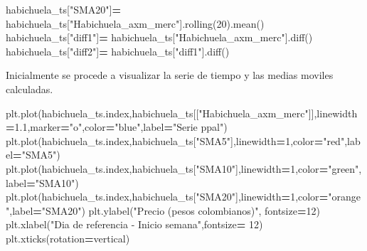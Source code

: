 \documentclass[
]{book}
\newenvironment{Shaded}{\begin{snugshade}}{\end{snugshade}}
\newcommand{\DecValTok}[1]{\textcolor[rgb]{0.00,0.00,0.81}{#1}}
\newcommand{\FloatTok}[1]{\textcolor[rgb]{0.00,0.00,0.81}{#1}}
\newcommand{\NormalTok}[1]{#1}
\newcommand{\OperatorTok}[1]{\textcolor[rgb]{0.81,0.36,0.00}{\textbf{#1}}}
\newcommand{\StringTok}[1]{\textcolor[rgb]{0.31,0.60,0.02}{#1}}
\begin{document}
\begin{Shaded}
\begin{Highlighting}[]
\NormalTok{habichuela\_ts[}\StringTok{"SMA20"}\NormalTok{]}\OperatorTok{=}\NormalTok{ habichuela\_ts[}\StringTok{"Habichuela\_axm\_merc"}\NormalTok{].rolling(}\DecValTok{20}\NormalTok{).mean()}
\NormalTok{habichuela\_ts[}\StringTok{"diff1"}\NormalTok{]}\OperatorTok{=}\NormalTok{ habichuela\_ts[}\StringTok{"Habichuela\_axm\_merc"}\NormalTok{].diff()}
\NormalTok{habichuela\_ts[}\StringTok{"diff2"}\NormalTok{]}\OperatorTok{=}\NormalTok{ habichuela\_ts[}\StringTok{"diff1"}\NormalTok{].diff()}
\end{Highlighting}
\end{Shaded}

Inicialmente se procede a visualizar la serie de tiempo y las medias moviles calculadas.

\begin{Shaded}
\begin{Highlighting}[]

\NormalTok{plt.plot(habichuela\_ts.index,habichuela\_ts[[}\StringTok{"Habichuela\_axm\_merc"}\NormalTok{]],linewidth}\OperatorTok{=}\FloatTok{1.1}\NormalTok{,marker}\OperatorTok{=}\StringTok{"o"}\NormalTok{,color}\OperatorTok{=}\StringTok{"blue"}\NormalTok{,label}\OperatorTok{=}\StringTok{"Serie ppal"}\NormalTok{)}
\NormalTok{plt.plot(habichuela\_ts.index,habichuela\_ts[}\StringTok{"SMA5"}\NormalTok{],linewidth}\OperatorTok{=}\DecValTok{1}\NormalTok{,color}\OperatorTok{=}\StringTok{"red"}\NormalTok{,label}\OperatorTok{=}\StringTok{"SMA5"}\NormalTok{)}
\NormalTok{plt.plot(habichuela\_ts.index,habichuela\_ts[}\StringTok{"SMA10"}\NormalTok{],linewidth}\OperatorTok{=}\DecValTok{1}\NormalTok{,color}\OperatorTok{=}\StringTok{"green"}\NormalTok{,label}\OperatorTok{=}\StringTok{"SMA10"}\NormalTok{)}
\NormalTok{plt.plot(habichuela\_ts.index,habichuela\_ts[}\StringTok{"SMA20"}\NormalTok{],linewidth}\OperatorTok{=}\DecValTok{1}\NormalTok{,color}\OperatorTok{=}\StringTok{"orange"}\NormalTok{,label}\OperatorTok{=}\StringTok{"SMA20"}\NormalTok{)}
\NormalTok{plt.ylabel(}\StringTok{"Precio (pesos colombianos)"}\NormalTok{, fontsize}\OperatorTok{=}\DecValTok{12}\NormalTok{)}
\NormalTok{plt.xlabel(}\StringTok{"Dia de referencia {-} Inicio semana"}\NormalTok{,fontsize}\OperatorTok{=} \DecValTok{12}\NormalTok{)}
\NormalTok{plt.xticks(rotation}\OperatorTok{=}\StringTok{\textquotesingle{}vertical\textquotesingle{}}\NormalTok{)}
\end{Highlighting}
\end{Shaded}
\end{document}
